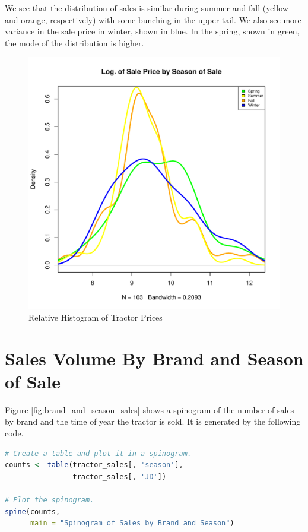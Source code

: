 \documentclass[11pt]{book}
\begin{document}
\pagebreak
We see that the distribution of sales is similar
during summer and fall (yellow and orange, respectively)
with some bunching in the upper tail.
We also see more variance in the sale price in winter,
shown in blue.
In the spring, shown in green, the mode of the distribution
is higher.

\begin{figure}[h!]
  \centering
  \includegraphics[scale = 0.5, keepaspectratio=true]{../Figures/dens_by_season}
  \caption{Relative Histogram of Tractor Prices} \label{fig:dens_by_season}
\end{figure}


\pagebreak
\section{Sales Volume By Brand and Season of Sale}

Figure \ref{fig:brand_and_season_sales}
shows a spinogram of the number of sales
by brand and the time of year the tractor is sold.
It is generated by the following code.

\begin{lstlisting}[language=R]
# Create a table and plot it in a spinogram.
counts <- table(tractor_sales[, 'season'],
                tractor_sales[, 'JD'])

# Plot the spinogram.
spine(counts,
      main = "Spinogram of Sales by Brand and Season")
\end{lstlisting}
\end{document}
